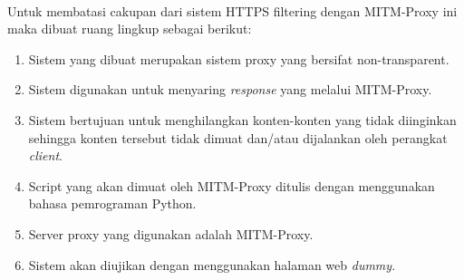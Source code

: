 \documentclass[./bab_1.tex]{subfiles}
\begin{document}
  \paragraph*{} Untuk membatasi cakupan dari sistem HTTPS filtering dengan
    MITM-Proxy ini maka dibuat ruang lingkup sebagai berikut:
    \begin{enumerate}
      \item Sistem yang dibuat merupakan sistem proxy yang
      bersifat non-transparent.
      \item Sistem digunakan untuk menyaring \textit{response}
      yang melalui MITM-Proxy.
      \item Sistem bertujuan untuk menghilangkan konten-konten
      yang tidak diinginkan sehingga konten tersebut tidak
      dimuat dan/atau dijalankan oleh perangkat \textit{client}.
      \item Script yang akan dimuat oleh MITM-Proxy ditulis
      dengan menggunakan bahasa pemrograman Python.
      \item Server proxy yang digunakan adalah MITM-Proxy.
      \item Sistem akan diujikan dengan menggunakan halaman
      web \textit{dummy}.
    \end{enumerate}
\end{document}

